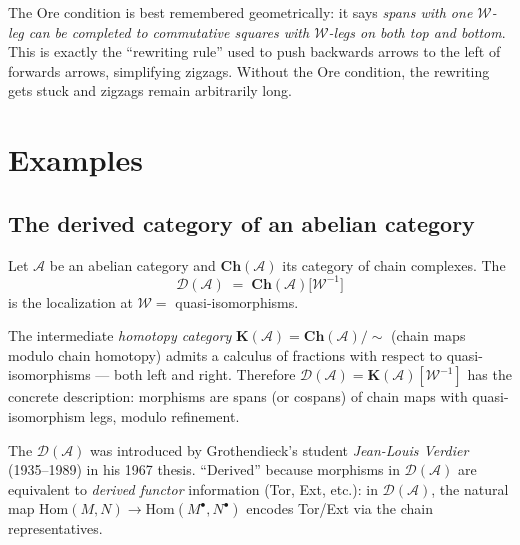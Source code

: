 \begin{readernote}
The Ore condition is best remembered geometrically: it says \emph{spans
with one $\mathcal{W}$-leg can be completed to commutative squares with
$\mathcal{W}$-legs on both top and bottom}. This is exactly the
``rewriting rule'' used to push backwards arrows to the left of
forwards arrows, simplifying zigzags. Without the Ore condition, the
rewriting gets stuck and zigzags remain arbitrarily long.
\end{readernote}


\section{Examples}
\label{sec:localization-examples}

\subsection{The derived category of an abelian category}

\begin{example_thm}
\label{ex:derived-cat}
Let $\mathcal{A}$ be an abelian category and $\mathbf{Ch}(\mathcal{A})$
its category of chain complexes. The 
\begin{equation*}
  \mathcal{D}(\mathcal{A}) \;=\; \mathbf{Ch}(\mathcal{A})\bigl[\mathcal{W}^{-1}\bigr]
\end{equation*}
is the localization at $\mathcal{W} =$ quasi-isomorphisms.

The intermediate \emph{homotopy category} $\mathbf{K}(\mathcal{A}) =
\mathbf{Ch}(\mathcal{A})/\sim$ (chain maps modulo chain homotopy) admits
a calculus of fractions with respect to quasi-isomorphisms — both left
and right. Therefore $\mathcal{D}(\mathcal{A}) =
\mathbf{K}(\mathcal{A})[\mathcal{W}^{-1}]$ has the concrete description:
morphisms are spans (or cospans) of chain maps with quasi-isomorphism
legs, modulo refinement.
\end{example_thm}

\begin{nameorigin}
The  $\mathcal{D}(\mathcal{A})$ was introduced
by Grothendieck's student \emph{Jean-Louis Verdier} (1935--1989) in his
1967 thesis. ``Derived'' because morphisms in $\mathcal{D}(\mathcal{A})$
are equivalent to \emph{derived functor} information (Tor, Ext, etc.):
in $\mathcal{D}(\mathcal{A})$, the natural map $\mathrm{Hom}(M, N) \to
\mathrm{Hom}(M^\bullet, N^\bullet)$ encodes Tor/Ext via the chain
representatives.
\end{nameorigin}

